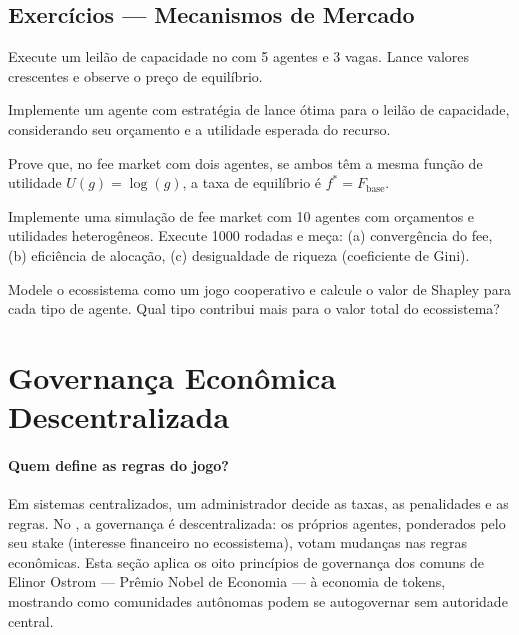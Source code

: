 \subsection{Exercícios — Mecanismos de Mercado}

\begin{exercicio}
Execute um leilão de capacidade no \opencodeeco{} com 5 agentes
e 3 vagas. Lance valores crescentes e observe o preço de
equilíbrio.
\end{exercicio}

\begin{exercicio}
Implemente um agente com estratégia de lance ótima para o leilão
de capacidade, considerando seu orçamento e a utilidade esperada
do recurso.
\end{exercicio}

\begin{exercicio}
Prove que, no fee market com dois agentes, se ambos têm a mesma
função de utilidade $U(g) = \log(g)$, a taxa de equilíbrio é
$f^* = F_{\text{base}}$.
\end{exercicio}

\begin{exercicio}
Implemente uma simulação de fee market com 10 agentes com
orçamentos e utilidades heterogêneos. Execute 1000 rodadas e
meça: (a) convergência do fee, (b) eficiência de alocação,
(c) desigualdade de riqueza (coeficiente de Gini).
\end{exercicio}

\begin{exercicio}
Modele o ecossistema como um jogo cooperativo e calcule o valor
de Shapley para cada tipo de agente. Qual tipo contribui mais
para o valor total do ecossistema?
\end{exercicio}

\section{Governança Econômica Descentralizada}
\label{sec:governanca-economica}
\nivelphd

\paragraph{Quem define as regras do jogo?} Em sistemas centralizados, um administrador decide as taxas, as penalidades e as regras. No \opencodeeco{}, a governança é descentralizada: os próprios agentes, ponderados pelo seu stake (interesse financeiro no ecossistema), votam mudanças nas regras econômicas. Esta seção aplica os oito princípios de governança dos comuns de Elinor Ostrom --- Prêmio Nobel de Economia --- à economia de tokens, mostrando como comunidades autônomas podem se autogovernar sem autoridade central.

